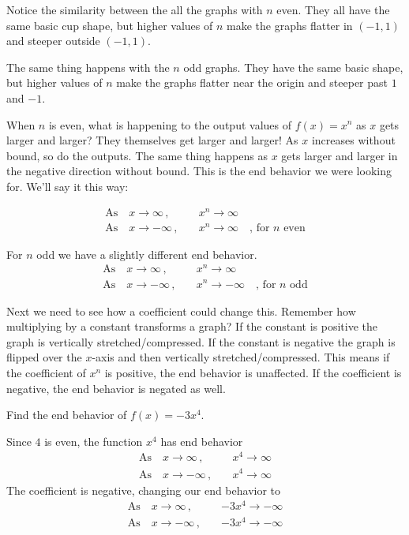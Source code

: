 \documentclass{ximera}
\begin{document}
Notice the similarity between the all the graphs with $n$ even.  They all have the same basic cup shape, but higher values of $n$ make the graphs flatter in $(-1,1)$ and steeper outside $(-1,1)$.

The same thing happens with the $n$ odd graphs.  They have the same basic shape, but higher values of $n$ make the graphs flatter near the origin and steeper past $1$ and $-1$.

When $n$ is even, what is happening to the output values of $f(x) = x^n$ as $x$ gets larger and larger?  They themselves get larger and larger!  As $x$ increases without bound, so do the outputs.
The same thing happens as $x$ gets larger and larger in the negative direction without bound.  This is the end behavior we were looking for.  We'll say it this way:

\begin{align*}
	\text{As} \quad x \to \infty \, ,  \quad & x^n \to \infty \\
	\text{As} \quad x \to -\infty \, , \quad & x^n \to \infty \quad \text{, for $n$ even}
\end{align*}

For $n$ odd we have a slightly different end behavior.
\begin{align*}
	\text{As} \quad x \to \infty \, ,  \quad & x^n \to \infty \\
	\text{As} \quad x \to -\infty \, , \quad & x^n \to -\infty \quad \text{, for $n$ odd}
\end{align*}

Next we need to see how a coefficient could change this.  Remember how multiplying by a constant transforms a graph?  If the constant is positive the graph is vertically stretched/compressed.
If the constant is negative the graph is flipped over the $x$-axis and then vertically stretched/compressed.  This means if the coefficient of $x^n$ is positive, the end behavior is unaffected.  If the 
coefficient is negative, the end behavior is negated as well.

\begin{example}
	Find the end behavior of $f(x) = -3x^4$.
	\begin{explanation}
		Since $4$ is even, the function $x^4$ has end behavior 
		\begin{align*}
			\text{As} \quad x \to \infty \, ,  \quad & x^4 \to \infty \\
			\text{As} \quad x \to -\infty \, , \quad & x^4 \to \infty 
		\end{align*}
		The coefficient is negative, changing our end behavior to
		\begin{align*}
			\text{As} \quad x \to \infty \, ,  \quad & -3x^4 \to -\infty \\
			\text{As} \quad x \to -\infty \, , \quad & -3x^4 \to -\infty 
		\end{align*}
	\end{explanation}
\end{example}
\end{document}
